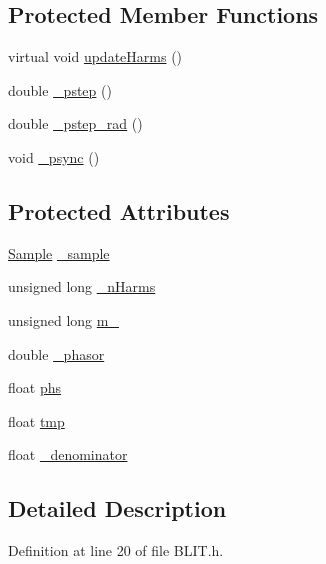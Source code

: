 \subsection*{Protected Member Functions}
\begin{DoxyCompactItemize}
\item 
virtual void \hyperlink{class_signal_1_1_b_l_i_t_a420e1540ee223244fe1af28b7527d41c}{update\+Harms} ()
\item 
double \hyperlink{class_signal_1_1_b_l_i_t_a5ef180600362d9cee13f7ffe91cc5110}{\+\_\+pstep} ()
\item 
double \hyperlink{class_signal_1_1_b_l_i_t_af0396c77f48507e2447ad7614d71ced2}{\+\_\+pstep\+\_\+rad} ()
\item 
void \hyperlink{class_signal_1_1_b_l_i_t_a429c0d14e7391341ac5d3ca989a937f8}{\+\_\+psync} ()
\end{DoxyCompactItemize}
\subsection*{Protected Attributes}
\begin{DoxyCompactItemize}
\item 
\hyperlink{class_signal_1_1_sample}{Sample} \hyperlink{class_signal_1_1_b_l_i_t_a627f58926f503669eb676d0f3fd90501}{\+\_\+sample}
\item 
unsigned long \hyperlink{class_signal_1_1_b_l_i_t_a9ec3a46bd37f7d76a8924dd7dd3622bd}{\+\_\+n\+Harms}
\item 
unsigned long \hyperlink{class_signal_1_1_b_l_i_t_a8433b0437335d7834f17e4fa975ace1a}{m\+\_\+}
\item 
double \hyperlink{class_signal_1_1_b_l_i_t_ae5ca010acf48cd0df232462cfaf95a3a}{\+\_\+phasor}
\item 
float \hyperlink{class_signal_1_1_b_l_i_t_ab43c19874ddb53d92ba7e3374ce94b33}{phs}
\item 
float \hyperlink{class_signal_1_1_b_l_i_t_aad33fcad866b50f9596d7b54eef4f27a}{tmp}
\item 
float \hyperlink{class_signal_1_1_b_l_i_t_a0219d8bf4a3c9ba979824ae269363885}{\+\_\+denominator}
\end{DoxyCompactItemize}


\subsection{Detailed Description}


Definition at line 20 of file B\+L\+I\+T.\+h.



